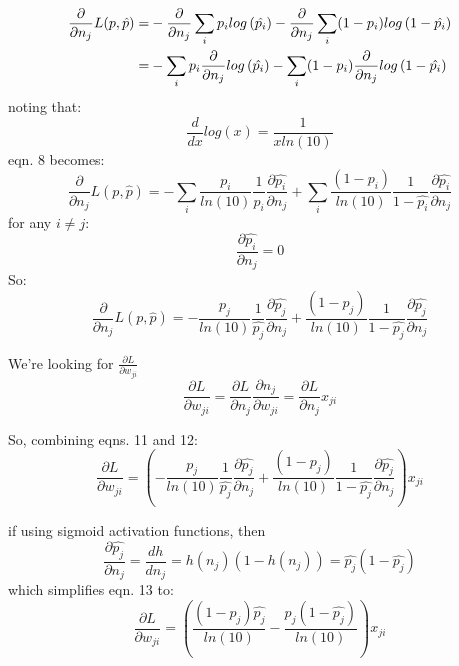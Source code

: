 \documentclass[12pt]{article}
\begin{document}
\begin{align}
    \frac{\partial}{\partial n_j}L(p,\hat{p}) =& -\frac{\partial}{\partial n_j}\sum_i p_i log\left(\hat{p_i}\right) 
    - \frac{\partial}{\partial n_j}\sum_i(1-p_i)log\left(1-\hat{p_i}\right) \notag \\
    =& -\sum_i p_i  \frac{\partial}{\partial n_j} log\left(\hat{p_i}\right) 
    - \sum_i(1-p_i) \frac{\partial}{\partial n_j} log\left(1-\hat{p_i}\right)
\end{align}
noting that: 
\begin{equation}
    \frac{d}{dx}log(x) = \frac{1}{x ln(10)}
\end{equation}
eqn. 8 becomes: 
\begin{equation}
    \frac{\partial}{\partial n_j}L(p,\hat{p}) = -\sum_i\frac{p_i}{ln(10)}  \frac{1}{\hat{p_i}}\frac{\partial \hat{p_i}}{\partial n_j}
    + \sum_i\frac{(1-p_i)}{ln(10)} \frac{1}{1-\hat{p_i}}\frac{\partial \hat{p_i}}{\partial n_j}
\end{equation}
for any $i \neq j$: 
\begin{equation}
    \frac{\partial \hat{p_i}}{\partial n_j} = 0 
\end{equation}
So: 
\begin{equation}
    \frac{\partial}{\partial n_j}L(p,\hat{p}) = -\frac{p_j}{ln(10)} \frac{1}{\hat{p_j}}\frac{\partial \hat{p_j}}{\partial n_j}
    + \frac{(1-p_j)}{ln(10)} \frac{1}{1-\hat{p_j}}\frac{\partial \hat{p_j}}{\partial n_j}
\end{equation}

We're looking for $\frac{\partial L}{\partial w_{ji}}$
\begin{equation}
    \frac{\partial L}{\partial w_{ji}} = \frac{\partial L}{\partial n_j}\frac{\partial n_j}{\partial w_{ji}} = \frac{\partial L}{\partial n_j}x_{ji}
\end{equation}

So, combining eqns. 11 and 12: 
\begin{equation}
    \frac{\partial L}{\partial w_{ji}} = \left( -\frac{p_j}{ln(10)} \frac{1}{\hat{p_j}}\frac{\partial \hat{p_j}}{\partial n_j}
    + \frac{(1-p_j)}{ln(10)} \frac{1}{1-\hat{p_j}}\frac{\partial \hat{p_j}}{\partial n_j} \right) x_{ji}
\end{equation}

if using sigmoid activation functions, then 
\begin{equation}
    \frac{\partial \hat{p_j}}{\partial n_j} = \frac{dh}{dn_j} = h(n_j)(1-h(n_j)) = \hat{p_j}(1-\hat{p_j})
\end{equation}
which simplifies eqn. 13 to: 
\begin{equation}
    \frac{\partial L}{\partial w_{ji}} = \left(\frac{(1-p_j)\hat{p_j}}{ln(10)}
     -\frac{p_j(1-\hat{p_j})}{ln(10)} \right) x_{ji}
\end{equation}
\end{document}
